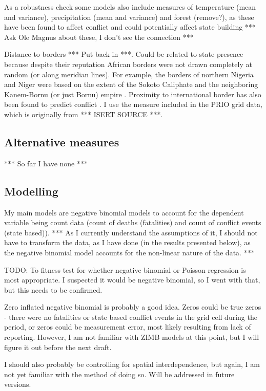\documentclass[12pt]{article}
\begin{document}
As a robustness check some models also include measures of temperature (mean and
variance), precipitation (mean and variance) and forest (remove?), as these have
been found to affect conflict and could potentially affect state building ***
Ask Ole Magnus about these, I don't see the connection ***

Distance to borders *** Put back in ***. Could be related to state presence
because despite their reputation African borders were not drawn completely at
random (or along meridian lines). For example, the borders of northern Nigeria
and Niger were based on the extent of the Sokoto Caliphate and the neighboring
Kanem-Bornu (or just Bornu) empire \citep{HiribarrenVincent2017AHoB}. Proximity
to international border has also been found to predict conflict
\citep{Buhaug2002}. I use the measure included in the PRIO grid data, which is
originally from *** ISERT SOURCE ***.

\subsection{Alternative measures}

*** So far I have none ***

\subsection{Modelling}

My main models are negative binomial models to account for the dependent
variable being count data (count of deaths (fatalities) and count of conflict
events (state based)). *** As I currently understand the assumptions of it, I
should not have to transform the data, as I have done (in the results presented
below), as the negative binomial model accounts for the non-linear nature of the
data. ***

TODO: To fitness test for whether negative binomial or Poisson regression is
most appropriate. I suspected it would be negative binomial, so I went with
that, but this needs to be confirmed.

Zero inflated negative binomial is probably a good idea. Zeros could be true
zeros - there were no fatalities or state based conflict events in the grid cell
during the period, or zeros could be measurement error, most likely resulting
from lack of reporting. However, I am not familiar with ZIMB models at this
point, but I will figure it out before the next draft.

I should also probably be controlling for spatial interdependence, but again, I
am not yet familiar with the method of doing so. Will be addressed in future
versions.
\end{document}
